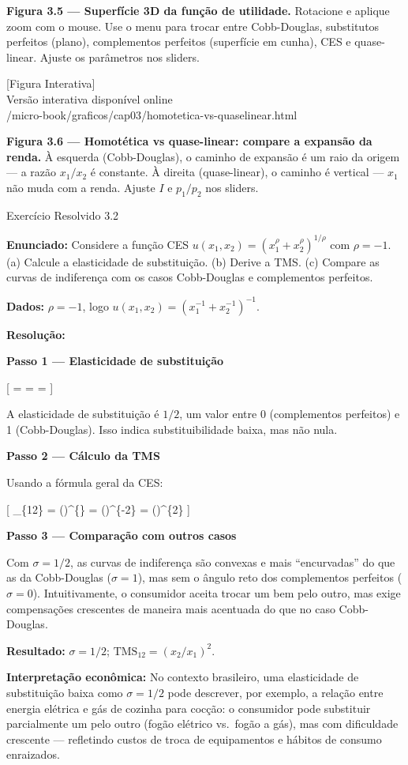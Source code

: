 \documentclass[11pt,twoside,openright]{book}
\newcommand{\figurePlaceholder}[1]{%
  \begin{center}
    \begin{tcolorbox}[
      width=0.85\textwidth,
      colback=graybg,
      colframe=gray,
      boxrule=0.5pt,
      arc=2pt,
      halign=center,
      valign=center,
      height=5cm
    ]
      \centering
      \vfill
      {\sffamily\color{gray}\large [Figura Interativa]}\\[6pt]
      {\sffamily\small\color{gray} Versão interativa disponível online}\\[4pt]
      {\ttfamily\tiny\color{gray} #1}
      \vfill
    \end{tcolorbox}
  \end{center}
}
\begin{document}
\textbf{Figura 3.5 --- Superfície 3D da função de utilidade.} Rotacione
e aplique zoom com o mouse. Use o menu para trocar entre Cobb-Douglas,
substitutos perfeitos (plano), complementos perfeitos (superfície em
cunha), CES e quase-linear. Ajuste os parâmetros nos sliders.

\figurePlaceholder{/micro-book/graficos/cap03/homotetica-vs-quaselinear.html}

\textbf{Figura 3.6 --- Homotética vs quase-linear: compare a expansão da
renda.} À esquerda (Cobb-Douglas), o caminho de expansão é um raio da
origem --- a razão \(x_1/x_2\) é constante. À direita (quase-linear), o
caminho é vertical --- \(x_1\) não muda com a renda. Ajuste \(I\) e
\(p_1/p_2\) nos sliders.

\begin{exresolvidobox}{Exercício Resolvido 3.2}

\textbf{Enunciado:} Considere a função CES
\(u(x_1, x_2) = (x_1^{\rho} + x_2^{\rho})^{1/\rho}\) com \(\rho = -1\).
(a) Calcule a elasticidade de substituição. (b) Derive a TMS. (c)
Compare as curvas de indiferença com os casos Cobb-Douglas e
complementos perfeitos.

\textbf{Dados:} \(\rho = -1\), logo
\(u(x_1, x_2) = (x_1^{-1} + x_2^{-1})^{-1}\).

\textbf{Resolução:}

\textbf{Passo 1 --- Elasticidade de substituição}

{[} \sigma =  =  =  {]}

A elasticidade de substituição é \(1/2\), um valor entre 0 (complementos
perfeitos) e 1 (Cobb-Douglas). Isso indica substituibilidade baixa, mas
não nula.

\textbf{Passo 2 --- Cálculo da TMS}

Usando a fórmula geral da CES:

{[} \_\{12\} = \left(\right)\^{}\{\} =
\left(\right)\^{}\{-2\} =
\left(\right)\^{}\{2\} {]}

\textbf{Passo 3 --- Comparação com outros casos}

Com \(\sigma = 1/2\), as curvas de indiferença são convexas e mais
``encurvadas'' do que as da Cobb-Douglas (\(\sigma = 1\)), mas sem o
ângulo reto dos complementos perfeitos (\(\sigma = 0\)). Intuitivamente,
o consumidor aceita trocar um bem pelo outro, mas exige compensações
crescentes de maneira mais acentuada do que no caso Cobb-Douglas.

\textbf{Resultado:} \(\sigma = 1/2\); \(\text{TMS}_{12} = (x_2/x_1)^2\).

\textbf{Interpretação econômica:} No contexto brasileiro, uma
elasticidade de substituição baixa como \(\sigma = 1/2\) pode descrever,
por exemplo, a relação entre energia elétrica e gás de cozinha para
cocção: o consumidor pode substituir parcialmente um pelo outro (fogão
elétrico vs.~fogão a gás), mas com dificuldade crescente --- refletindo
custos de troca de equipamentos e hábitos de consumo enraizados.

\end{exresolvidobox}
\end{document}
